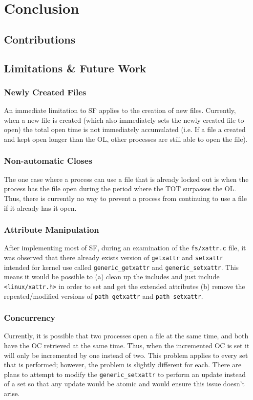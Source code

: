 \section{Conclusion}

\subsection{Contributions}

\subsection{Limitations \& Future Work}

\subsubsection*{Newly Created Files}

An immediate limitation to SF applies to the creation of new files. Currently, when a new file is created (which also immediately sets the newly created file to open) the total open time is not immediately accumulated (i.e. If a file a created and kept open longer than the OL, other processes are still able to open the file).

\subsubsection*{Non-automatic Closes}

The one case where a process can use a file that is already locked out is when the process has the file open during the period where the TOT surpasses the OL. Thus, there is currently no way to prevent a process from continuing to use a file if it already has it open.

\subsubsection*{Attribute Manipulation}

After implementing most of SF, during an examination of the \texttt{fs/xattr.c} file, it was observed that there already exists version of \texttt{getxattr} and \texttt{setxattr} intended for kernel use called \texttt{generic\_getxattr} and \texttt{generic\_setxattr}. This means it would be possible to (a) clean up the includes and just include \texttt{<linux/xattr.h>} in order to set and get the extended attributes (b) remove the repeated/modified versions of \texttt{path\_getxattr} and \texttt{path\_setxattr}.

\subsubsection*{Concurrency}

Currently, it is possible that two processes open a file at the same time, and both have the OC retrieved at the same time. Thus, when the incremented OC is set it will only be incremented by one instead of two. This problem applies to every set that is performed; however, the problem is slightly different for each. There are plans to attempt to modify the \texttt{generic\_setxattr} to perform an update instead of a set so that any update would be atomic and would ensure this issue doesn't arise.
